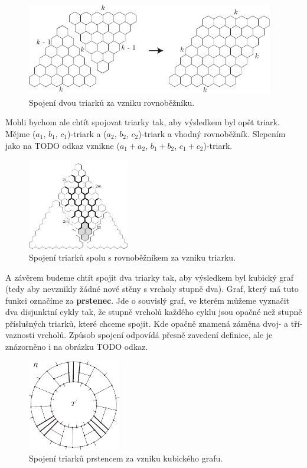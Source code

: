 \begin{figure}[h!]\centering
\includegraphics[height=40mm]{../img/T-P}
\caption{Spojení dvou triarků za vzniku rovnoběžníku.}
\label{obr21:T-P}
\end{figure}

Mohli bychom ale chtít spojovat triarky tak, aby výsledkem byl opět triark. Mějme ($a_1$, $b_1$, $c_1$)-triark a ($a_2$, $b_2$, $c_2$)-triark a vhodný rovnoběžník. Slepením jako na TODO odkaz vznikne ($a_1+a_2$, $b_1+b_2$, $c_1+c_2$)-triark. 

\begin{figure}[h!]\centering
\includegraphics[height=40mm]{../img/T-T}
\caption{Spojení triarků spolu s rovnoběžníkem za vzniku triarku.}
\label{obr22:T-T}
\end{figure}

A závěrem budeme chtít spojit dva triarky tak, aby výsledkem byl kubický graf (tedy aby nevznikly žádné nové stěny s vrcholy stupně dva). Graf, který má tuto funkci označíme za \textbf{prstenec}. Jde o souvislý graf, ve kterém můžeme vyznačit dva disjunktní cykly tak, že stupně vrcholů každého cyklu jsou opačné než stupně příslušných triarků, které chceme spojit. Kde opačně znamená záměna dvoj- a tří- vaznosti vrcholů. Způsob spojení odpovídá přesně zavedení definice, ale je znázorněno i na obrázku TODO odkaz. 

\begin{figure}[h!]\centering
\includegraphics[height=40mm]{../img/T-G}
\caption{Spojení triarků prstencem za vzniku kubického grafu.}
\label{obr23:T-G}
\end{figure}

